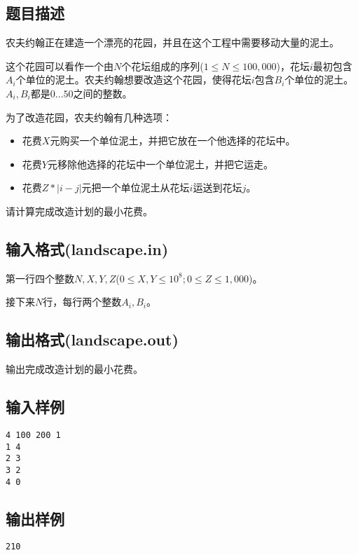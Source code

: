 \documentclass[hyperref,UTF8,12pt,a4paper]{ctexart}
\begin{document}
\subsection{题目描述}

农夫约翰正在建造一个漂亮的花园，并且在这个工程中需要移动大量的泥土。

这个花园可以看作一个由$N$个花坛组成的序列($1\le N\le100,000$)，花坛$i$最初包含$A_i$个单位的泥土。农夫约翰想要改造这个花园，使得花坛$i$包含$B_i$个单位的泥土。$A_i,B_i$都是$0\dots50$之间的整数。

为了改造花园，农夫约翰有几种选项：

\begin{itemize}
\item 花费$X$元购买一个单位泥土，并把它放在一个他选择的花坛中。
\item 花费$Y$元移除他选择的花坛中一个单位泥土，并把它运走。
\item 花费$Z*|i-j|$元把一个单位泥土从花坛$i$运送到花坛$j$。
\end{itemize}

请计算完成改造计划的最小花费。

\subsection{输入格式(landscape.in)}

第一行四个整数$N,X,Y,Z$($0\le X,Y\le10^8;0\le Z\le1,000$)。

接下来$N$行，每行两个整数$A_i,B_i$。

\subsection{输出格式(landscape.out)}

输出完成改造计划的最小花费。

\subsection{输入样例}

\begin{verbatim}
4 100 200 1
1 4
2 3
3 2
4 0
\end{verbatim}

\subsection{输出样例}

\begin{verbatim}
210
\end{verbatim}
\end{document}
